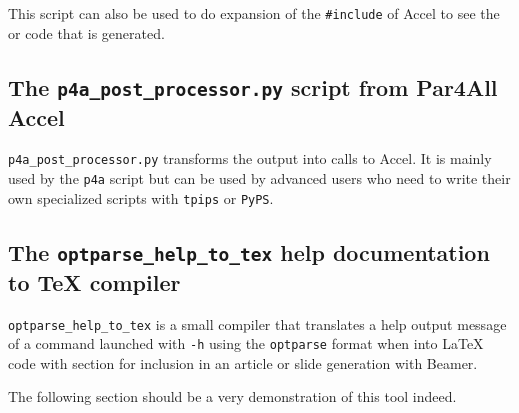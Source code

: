 \documentclass[a4paper]{article}
\begin{document}
This script can also be used to do expansion of the \verb|#include| of
\Apfa Accel to see the \Acuda or \Aopenmp code
that is generated.




\subsection{The \protect\texttt{p4a\_post\_processor.py} script from
  Par4All Accel}
\label{sec:p4a_p-script-from}

\verb|p4a_post_processor.py| transforms the \Apips
output into calls to \Apfa Accel. It is mainly used by the \texttt{p4a}
script but can be used by advanced users who need to write their own
specialized \Apips scripts with \texttt{tpips} or \texttt{PyPS}.




\subsection{The \protect\texttt{optparse\_help\_to\_tex} help
  documentation to \TeX{} compiler}
\label{sec:help-docum-tex}

\verb|optparse_help_to_tex| is a small compiler that translates a help
output message of a command launched with \texttt{-h} using the
\texttt{optparse} format when into La\TeX{} code with section for
inclusion in
an article or slide generation with Beamer.

The following section should be a very demonstration of this tool
indeed. \smiley



\end{document}
